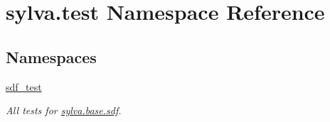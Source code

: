 \hypertarget{namespacesylva_1_1test}{}\section{sylva.\+test Namespace Reference}
\label{namespacesylva_1_1test}
\subsection*{Namespaces}
\begin{DoxyCompactItemize}
\item 
 \hyperlink{namespacesylva_1_1test_1_1sdf__test}{sdf\+\_\+test}
\begin{DoxyCompactList}\small\item\em All tests for \hyperlink{namespacesylva_1_1base_1_1sdf}{sylva.\+base.\+sdf}. \end{DoxyCompactList}\end{DoxyCompactItemize}
